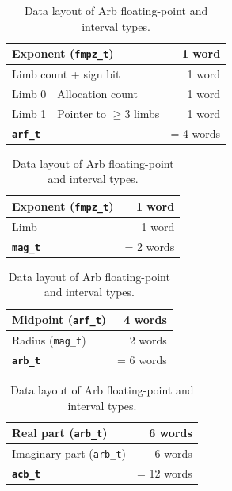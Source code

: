 \documentclass[10pt,journal,compsoc,cspaper]{IEEEtran}
\begin{document}
\begin{table}[t!]
\caption{Data layout of Arb floating-point and interval types.}
\label{tab:datalayout}
\begin{center}
\begin{tabular}{|l|l|r|}
\hline
\multicolumn{2}{|l|}{Exponent (\texttt{fmpz\_t})} & 1 word\phantom{s} \\
\hline
\multicolumn{2}{|l|}{Limb count + sign bit} & 1 word\phantom{s} \\
\hline
Limb 0 & Allocation count & 1 word\phantom{s} \\
\hline
Limb 1 & Pointer to $\ge\!3$ limbs & 1 word\phantom{s} \\
\hline
\multicolumn{2}{|l|}{\textbf{\texttt{arf\_t}}} & = 4 words \\
\hline
\end{tabular}%
\end{center}

\begin{center}
\begin{tabular}{|l|l|r|}
\hline
\multicolumn{2}{|l|}{Exponent (\texttt{fmpz\_t})} & 1 word\phantom{s} \\
\hline
\multicolumn{2}{|l|}{Limb} & 1 word\phantom{s} \\
\hline
\multicolumn{2}{|l|}{\textbf{\texttt{mag\_t}}} & = 2 words \\
\hline
\end{tabular}%
\end{center}

\begin{center}
\begin{tabular}{|l|l|r|}
\hline
\multicolumn{2}{|l|}{Midpoint (\texttt{arf\_t})} & 4 words \\
\hline
\multicolumn{2}{|l|}{Radius (\texttt{mag\_t})} & 2 words \\
\hline
\multicolumn{2}{|l|}{\textbf{\texttt{arb\_t}}} & = 6 words \\
\hline
\end{tabular}
\end{center}

\begin{center}
\begin{tabular}{|l|l|r|}
\hline
\multicolumn{2}{|l|}{Real part (\texttt{arb\_t})} & 6 words \\
\hline
\multicolumn{2}{|l|}{Imaginary part (\texttt{arb\_t})} & 6 words \\
\hline
\multicolumn{2}{|l|}{\textbf{\texttt{acb\_t}}} & = 12 words \\
\hline
\end{tabular}
\end{center}
\end{table}
\end{document}
